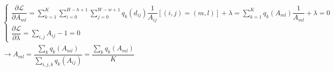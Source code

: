 \begin{gather*}
	\begin{cases}
		\dfrac{\partial \mathcal{L}}{\partial A_{ml}} = \sum_{k=1}^{K} \sum_{i=0}^{H-h+1} \sum_{j=0}^{W-w+1} q_k(d_{ij}) \dfrac{1}{A_{ij}} [(i,j) = (m, l)] + \lambda = \sum_{k=1}^{K} q_k(A_{ml}) \dfrac{1}{A_{ml}} + \lambda = 0 \\
		\dfrac{\partial \mathcal{L}}{\partial \lambda} = \sum_{i, j} A_{ij} - 1 = 0
	\end{cases}\\	
	\rightarrow A_{ml} = \dfrac{\sum_{k} q_k (A_{ml})}{\sum_{i, j, k} q_k(A_{ij})} = \dfrac{\sum_{k} q_k (A_{ml})}{K}
\end{gather*} 